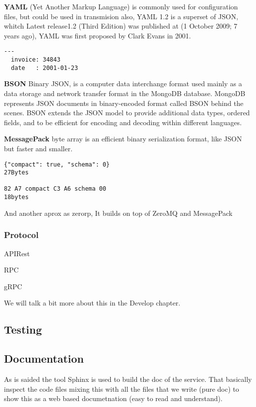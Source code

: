 \textbf{YAML} (Yet Another Markup Language)
 is commonly used for configuration files, but could be used in transmision also,
 YAML 1.2 is a superset of JSON, whitch Latest release1.2 (Third Edition) was published
 at (1 October 2009; 7 years ago), YAML was first proposed by Clark Evans in 2001.

\begin{lstlisting}[frame=none,numbers=none]
  ---
  invoice: 34843
  date   : 2001-01-23
\end{lstlisting}


\textbf{BSON}
Binary JSON, is a computer data interchange format used mainly as a data storage
and network transfer format in the MongoDB database.
MongoDB represents JSON documents in binary-encoded format called BSON behind
the scenes. BSON extends the JSON model to provide additional data types,
ordered fields, and to be efficient for encoding and decoding within different languages.

\textbf{MessagePack}
byte array
is an efficient binary serialization format, like JSON but faster and smaller.

\begin{lstlisting}[frame=none,numbers=none]
{"compact": true, "schema": 0}
27Bytes

82 A7 compact C3 A6 schema 00
18bytes
\end{lstlisting}

And another aprox as zerorp, It builds on top of ZeroMQ and MessagePack

\subsubsection{Protocol}

APIRest

RPC

  gRPC


We will talk a bit more about this in the Develop chapter.


\subsection{Testing}




\subsection{Documentation}

As is saided the tool Sphinx is used to build the doc of the service.
That basically inspect the code files mixing this with all the files
that we write (pure doc) to show this as a web based documetnation
(easy to read and understand).

